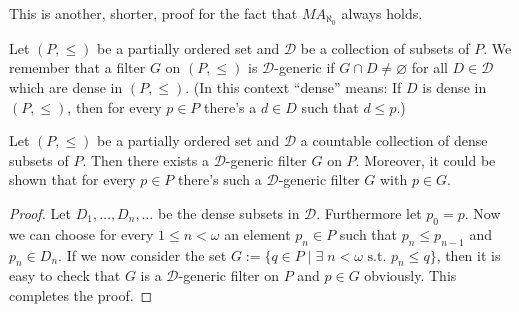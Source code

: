 \documentclass[12pt]{article}
\begin{document}

This is another, shorter, proof for the fact that $MA_{\aleph_0}$ always holds.

Let $(P,\leq)$ be a partially ordered set and $\mathcal D$ be a collection of subsets of $P$. We remember that a filter $G$ on $(P,\leq)$ is $\mathcal D$-generic if $G \cap D \neq \varnothing$ for all $D \in \mathcal D$ which are dense in $(P,\leq)$. (In this context ``dense'' means: If $D$ is dense in $(P,\leq)$, then for every $p \in P$ there's a $d \in D$ such that $d \leq p$.)

Let $(P,\leq)$ be a partially ordered set and $\mathcal D$ a countable collection of dense subsets of $P$. Then there exists a $\mathcal D$-generic filter $G$ on $P$. Moreover, it could be shown that for every $p \in P$ there's such a $\mathcal D$-generic filter $G$ with $p \in G$.

\begin{proof} 
Let $D_1,\dots, D_n, \dots$ be the dense subsets in $\mathcal D$. Furthermore let $p_0 = p$. Now we can choose for every $1 \leq n < \omega$ an element $p_n \in P$ such that $p_n \leq p_{n-1}$ and $p_n \in D_n$. If we now consider the set $G:=\{ q \in P \mid \exists \; n < \omega \text{ s.t. } p_n \leq q \}$, then it is easy to check that $G$ is a $\mathcal D$-generic filter on $P$ and $p \in G$ obviously. This completes the proof.
\end{proof}
\end{document}
